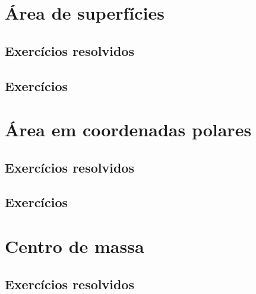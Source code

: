 \section{Área de superfícies}
\construirSec

\subsection*{Exercícios resolvidos}

\construirExeresol


\subsection*{Exercícios}

\construirExer






\section{Área em coordenadas polares}
\construirSec

\subsection*{Exercícios resolvidos}

\construirExeresol


\subsection*{Exercícios}

\construirExer




\section{Centro de massa}
\construirSec

\subsection*{Exercícios resolvidos}

